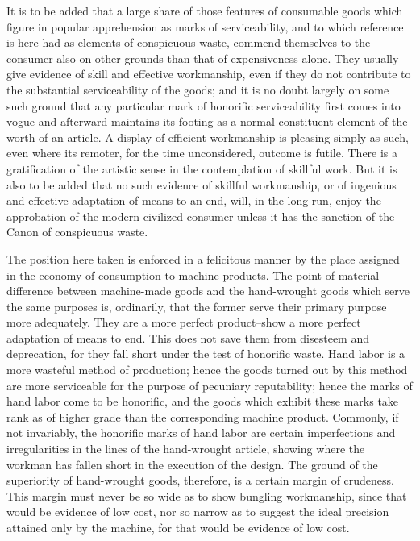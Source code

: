 \documentclass[12pt]{report}
\begin{document}
It is to be added that a large share of those features of consumable
goods which figure in popular apprehension as marks of serviceability,
and to which reference is here had as elements of conspicuous waste,
commend themselves to the consumer also on other grounds than that of
expensiveness alone. They usually give evidence of skill and effective
workmanship, even if they do not contribute to the substantial
serviceability of the goods; and it is no doubt largely on some such
ground that any particular mark of honorific serviceability first comes
into vogue and afterward maintains its footing as a normal constituent
element of the worth of an article. A display of efficient workmanship
is pleasing simply as such, even where its remoter, for the time
unconsidered, outcome is futile. There is a gratification of the
artistic sense in the contemplation of skillful work. But it is also to
be added that no such evidence of skillful workmanship, or of ingenious
and effective adaptation of means to an end, will, in the long run,
enjoy the approbation of the modern civilized consumer unless it has the
sanction of the Canon of conspicuous waste.

The position here taken is enforced in a felicitous manner by the place
assigned in the economy of consumption to machine products. The point
of material difference between machine-made goods and the hand-wrought
goods which serve the same purposes is, ordinarily, that the former
serve their primary purpose more adequately. They are a more perfect
product--show a more perfect adaptation of means to end. This does not
save them from disesteem and deprecation, for they fall short under
the test of honorific waste. Hand labor is a more wasteful method
of production; hence the goods turned out by this method are more
serviceable for the purpose of pecuniary reputability; hence the marks
of hand labor come to be honorific, and the goods which exhibit these
marks take rank as of higher grade than the corresponding machine
product. Commonly, if not invariably, the honorific marks of hand
labor are certain imperfections and irregularities in the lines of the
hand-wrought article, showing where the workman has fallen short in the
execution of the design. The ground of the superiority of hand-wrought
goods, therefore, is a certain margin of crudeness. This margin must
never be so wide as to show bungling workmanship, since that would be
evidence of low cost, nor so narrow as to suggest the ideal precision
attained only by the machine, for that would be evidence of low cost.
\end{document}

